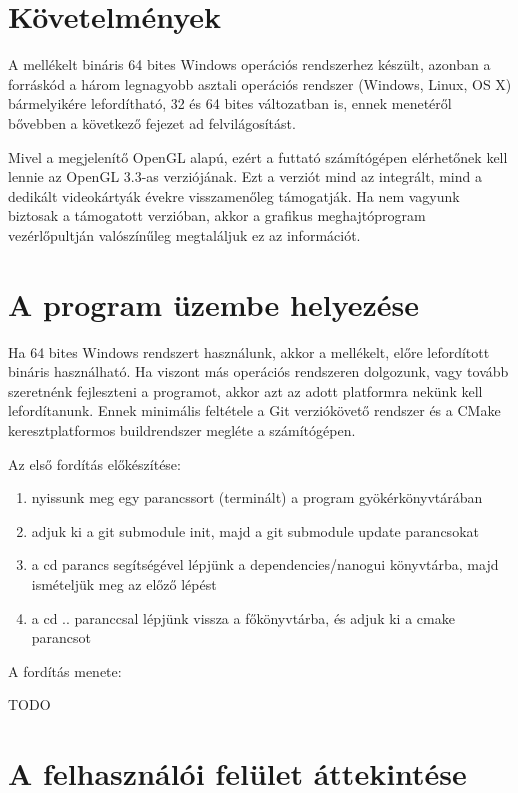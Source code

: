 
\section{Követelmények}

A mellékelt bináris 64 bites Windows operációs rendszerhez készült, azonban a forráskód a három legnagyobb asztali operációs rendszer (Windows, Linux, OS X) bármelyikére lefordítható, 32 és 64 bites változatban is, ennek menetéről bővebben a következő fejezet ad felvilágosítást.

Mivel a megjelenítő OpenGL alapú, ezért a futtató számítógépen elérhetőnek kell lennie az OpenGL 3.3-as verziójának. Ezt a verziót mind az integrált, mind a dedikált videokártyák évekre visszamenőleg támogatják. Ha nem vagyunk biztosak a támogatott verzióban, akkor a grafikus meghajtóprogram vezérlőpultján valószínűleg megtaláljuk ez az információt.

\section{A program üzembe helyezése}

Ha 64 bites Windows rendszert használunk, akkor a mellékelt, előre lefordított bináris használható. Ha viszont más operációs rendszeren dolgozunk, vagy tovább szeretnénk fejleszteni a programot, akkor azt az adott platformra nekünk kell lefordítanunk. Ennek minimális feltétele a Git verziókövető rendszer és a CMake keresztplatformos buildrendszer megléte a számítógépen.

Az első fordítás előkészítése:

\begin{enumerate}[noitemsep]
\item nyissunk meg egy parancssort (terminált) a program gyökérkönyvtárában
\item adjuk ki a git submodule init, majd a git submodule update parancsokat
\item a cd parancs segítségével lépjünk a dependencies/nanogui könyvtárba, majd ismételjük meg az előző lépést
\item a cd .. paranccsal lépjünk vissza a főkönyvtárba, és adjuk ki a cmake parancsot
\end{enumerate}

A fordítás menete:

TODO

\section{A felhasználói felület áttekintése}

